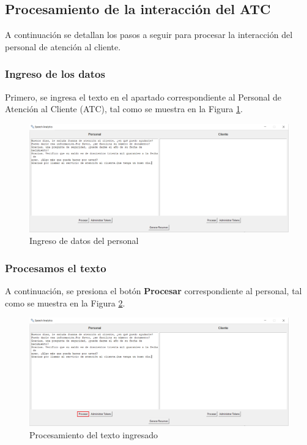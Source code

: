 \documentclass[10pt,times,twocolumn]{article}
\begin{document}
\subsection{Procesamiento de la interacción del ATC}
A continuación se detallan los pasos a seguir para procesar la interacción del personal de atención al cliente.

\subsubsection{Ingreso de los datos}
Primero, se ingresa el texto en el apartado correspondiente al Personal de Atención al Cliente (ATC), tal como se muestra en la Figura \ref{fig:graf_atc_paso1}.

\begin{figure}[H]
    \centering
    \includegraphics[width=\linewidth]{fig/ATC_paso1.png}
    \caption{Ingreso de datos del personal}
    \label{fig:graf_atc_paso1}
\end{figure}

\subsubsection{Procesamos el texto}
A continuación, se presiona el botón \textbf{Procesar} correspondiente al personal, tal como se muestra en la Figura \ref{fig:graf_atc_paso2}.

\begin{figure}[H]
    \centering
    \includegraphics[width=\linewidth]{fig/ATC_paso2.png}
    \caption{Procesamiento del texto ingresado}
    \label{fig:graf_atc_paso2}
\end{figure}
\end{document}
